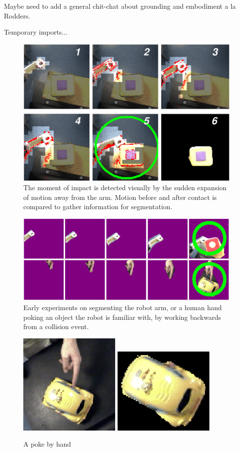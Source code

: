 {\LARGE
Maybe need to add a general chit-chat about grounding and embodiment
a la Rodders.
}

\ifverbose
Temporary imports...

\begin{figure}[tbh]
  \begin{center}
    \includegraphics[width=12cm]{collision-detail}
  \end{center}
  \caption{
    The moment of impact is detected visually by the
    sudden expansion of motion away from the arm.  Motion before and
    after contact is compared to gather information for segmentation.
}
\end{figure}

\begin{figure}[tbh]
  \centerline{\includegraphics[width=12cm]{manipulator-segment}}
  \caption{Early experiments on segmenting the robot arm, or a 
human hand poking an object the robot is familiar with, by working
backwards from a collision event.}
  \label{fig:manipulator}
\end{figure}

\begin{figure}[tbh]
  \centerline{
\includegraphics[width=5cm]{fig-car-hand-seg-src}
\hspace{1cm}
\includegraphics[width=5cm]{fig-car-hand-seg}
}
  \caption{A poke by hand}
  \label{fig:handpoke}
\end{figure}
\fi
